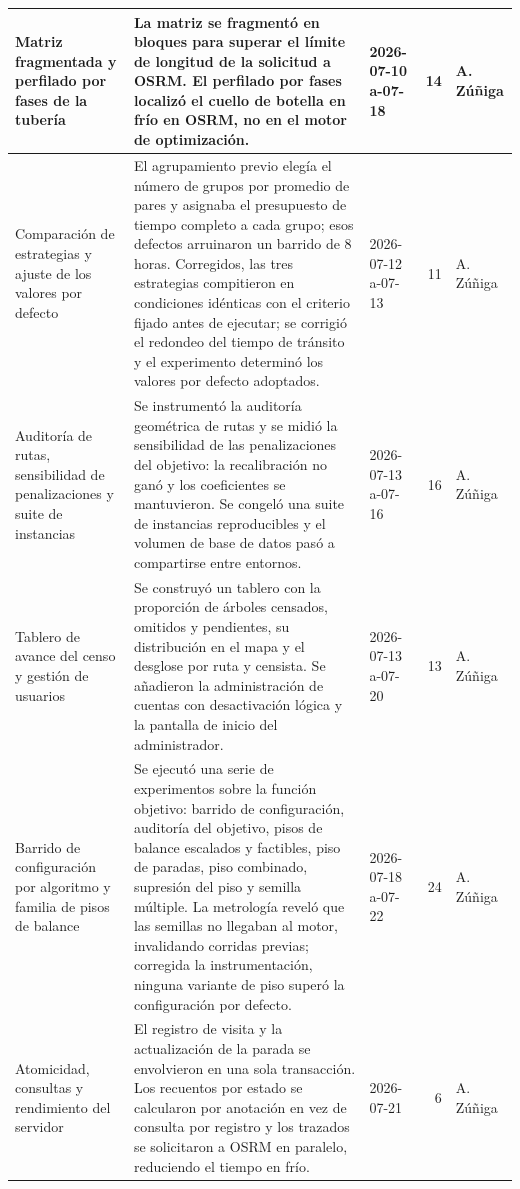 \begin{xltabular}{\linewidth}{|p{3cm}|X|p{3cm}|r|l|}
\hline
Matriz fragmentada y perfilado por fases de la tubería & La matriz se fragmentó en bloques para superar el límite de longitud de la solicitud a OSRM. El perfilado por fases localizó el cuello de botella en frío en OSRM, no en el motor de optimización. & 2026-07-10 a-07-18 & 14 & A. Zúñiga \\
\hline
Comparación de estrategias y ajuste de los valores por defecto & El agrupamiento previo elegía el número de grupos por promedio de pares y asignaba el presupuesto de tiempo completo a cada grupo; esos defectos arruinaron un barrido de 8 horas. Corregidos, las tres estrategias compitieron en condiciones idénticas con el criterio fijado antes de ejecutar; se corrigió el redondeo del tiempo de tránsito y el experimento determinó los valores por defecto adoptados. & 2026-07-12 a-07-13 & 11 & A. Zúñiga \\
\hline
Auditoría de rutas, sensibilidad de penalizaciones y suite de instancias & Se instrumentó la auditoría geométrica de rutas y se midió la sensibilidad de las penalizaciones del objetivo: la recalibración no ganó y los coeficientes se mantuvieron. Se congeló una suite de instancias reproducibles y el volumen de base de datos pasó a compartirse entre entornos. & 2026-07-13 a-07-16 & 16 & A. Zúñiga \\
\hline
Tablero de avance del censo y gestión de usuarios & Se construyó un tablero con la proporción de árboles censados, omitidos y pendientes, su distribución en el mapa y el desglose por ruta y censista. Se añadieron la administración de cuentas con desactivación lógica y la pantalla de inicio del administrador. & 2026-07-13 a-07-20 & 13 & A. Zúñiga \\
\hline
Barrido de configuración por algoritmo y familia de pisos de balance & Se ejecutó una serie de experimentos sobre la función objetivo: barrido de configuración, auditoría del objetivo, pisos de balance escalados y factibles, piso de paradas, piso combinado, supresión del piso y semilla múltiple. La metrología reveló que las semillas no llegaban al motor, invalidando corridas previas; corregida la instrumentación, ninguna variante de piso superó la configuración por defecto. & 2026-07-18 a-07-22 & 24 & A. Zúñiga \\
\hline
Atomicidad, consultas y rendimiento del servidor & El registro de visita y la actualización de la parada se envolvieron en una sola transacción. Los recuentos por estado se calcularon por anotación en vez de consulta por registro y los trazados se solicitaron a OSRM en paralelo, reduciendo el tiempo en frío. & 2026-07-21 & 6 & A. Zúñiga \\

\end{xltabular}
